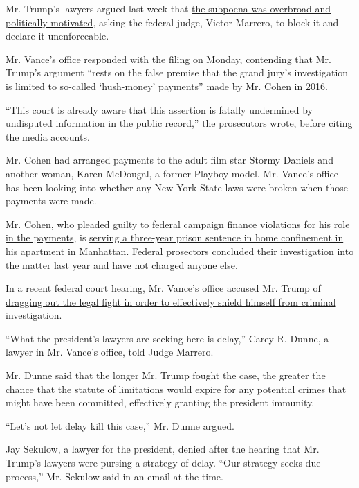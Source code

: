 Mr. Trump's lawyers argued last week that
\href{https://www.nytimes3xbfgragh.onion/2020/07/27/nyregion/donald-trump-taxes-cyrus-vance.html}{the
subpoena was overbroad and politically motivated}, asking the federal
judge, Victor Marrero, to block it and declare it unenforceable.

Mr. Vance's office responded with the filing on Monday, contending that
Mr. Trump's argument ``rests on the false premise that the grand jury's
investigation is limited to so-called `hush-money' payments'' made by
Mr. Cohen in 2016.

``This court is already aware that this assertion is fatally undermined
by undisputed information in the public record,'' the prosecutors wrote,
before citing the media accounts.

Mr. Cohen had arranged payments to the adult film star Stormy Daniels
and another woman, Karen McDougal, a former Playboy model. Mr. Vance's
office has been looking into whether any New York State laws were broken
when those payments were made.

Mr. Cohen,
\href{https://www.nytimes3xbfgragh.onion/2018/11/29/nyregion/michael-cohen-trump-russia-mueller.html}{who
pleaded guilty to federal campaign finance violations for his role in
the payments}, is
\href{https://www.nytimes3xbfgragh.onion/2020/07/23/nyregion/michael-cohen-trump-book.html}{serving
a three-year prison sentence in home confinement in his apartment} in
Manhattan.
\href{https://www.nytimes3xbfgragh.onion/2019/07/17/nyregion/michael-cohen-trump-investigation.html}{Federal
prosectors concluded their investigation} into the matter last year and
have not charged anyone else.

In a recent federal court hearing, Mr. Vance's office accused
\href{https://www.nytimes3xbfgragh.onion/2020/07/16/nyregion/donald-trump-taxes-cyrus-vance.html}{Mr.
Trump of dragging out the legal fight in order to effectively shield
himself from criminal investigation}.

``What the president's lawyers are seeking here is delay,'' Carey R.
Dunne, a lawyer in Mr. Vance's office, told Judge Marrero.

Mr. Dunne said that the longer Mr. Trump fought the case, the greater
the chance that the statute of limitations would expire for any
potential crimes that might have been committed, effectively granting
the president immunity.

``Let's not let delay kill this case,'' Mr. Dunne argued.

Jay Sekulow, a lawyer for the president, denied after the hearing that
Mr. Trump's lawyers were pursing a strategy of delay. ``Our strategy
seeks due process,'' Mr. Sekulow said in an email at the time.

